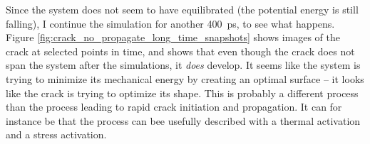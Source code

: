 Since the system does not seem to have equilibrated (the potential energy is still falling), I continue the simulation for another \SI{400}{\pico\second}, to see what happens. Figure \ref{fig:crack_no_propagate_long_time_snapshots} shows images of the crack at selected points in time, and shows that even though the crack does not span the system after the simulations, it \emph{does} develop. It seems like the system is trying to minimize its mechanical energy by creating an optimal surface -- it looks like the crack is trying to optimize its shape. This is probably a different process than the process leading to rapid crack initiation and propagation. It can for instance be that the process can bee usefully described with a thermal activation and a stress activation. 

\begin{figure}
\begin{minipage}[b]{0.24\linewidth}
\end{minipage}

\end{figure}
